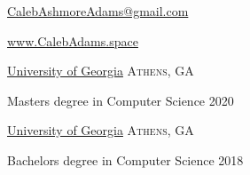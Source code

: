 \documentclass[10pt,a4paper]{article}
\begin{document}
\sloppy  %



\nobreakvspace{0.6em}  %

\href{mailto:CalebAshmoreAdams@gmail.com}{CalebAshmoreAdams\mbox{}@\mbox{}gmail.com}

\href{http://calebadams.space}{www.CalebAdams.space}
\\

\spacedhrule{0.5em}{-0.4em}
\spacedhrule{0.5em}{-0.4em}


\headedsection
  {\href{http://uga.edu}{University of Georgia}}
  {\textsc{Athens, GA}} {%
  \headedsubsection
    {Masters degree in Computer Science}
    {2020}
    {\bodytext{}}

  }
\headedsection
  {\href{http://uga.edu}{University of Georgia}}
  {\textsc{Athens, GA}} {%
  \headedsubsection
    {Bachelors degree in Computer Science}
    {2018}
    {\bodytext{}}

  }



\spacedhrule{0em}{-0.4em}
\end{document}
